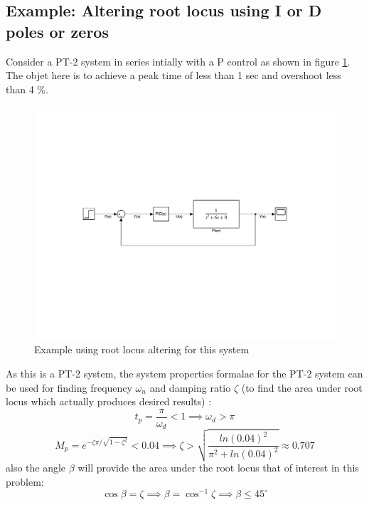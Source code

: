 \subsection{Example: Altering root locus using I or D poles or zeros}

Consider a PT-2 system in series intially with a P control as shown in figure \ref{Fig_RootLocus_Ex_2_sys}. The objet here is to achieve a peak time of less than 1 sec and overshoot less than 4 \%.
\begin{figure}[h!]
	\centering
	\includegraphics[width=\linewidth]{Bilder/RootLocus_ControlDesign.pdf}
	\caption{Example using root locus altering for this system}
	\label{Fig_RootLocus_Ex_2_sys}
\end{figure}
As this is a PT-2 system, the system properties formalae for the PT-2 system can be used for finding frequency $\omega_{n}$ and damping ratio $\zeta$ (to find the area under root locus which actually produces desired results) :
\begin{equation}
	t_p = \frac{\pi}{\omega_{d}} < 1 \implies \omega_{d} > \pi
\end{equation}
\begin{equation}
	M_p = e^{-\zeta \pi / \sqrt{1 - \zeta^2}} < 0.04 \implies \zeta > \sqrt{\frac{ln(0.04)^2}{\pi^2 + ln(0.04)^2}} \approx 0.707
\end{equation}
also the angle $\beta$ will provide the area under the root locus that of interest in this problem:
\begin{equation}
	\cos{\beta} = \zeta \implies \beta = \cos^{-1}{\zeta} \implies \beta \leq 45^{\circ}
\end{equation}

